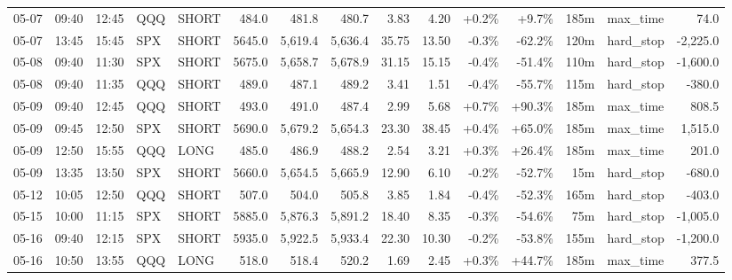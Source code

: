 \documentclass[11pt,a4paper,twoside]{article}
\begin{document}
\begin{landscape}
\begin{center}
\begin{longtable}{>{\color{txtmain}}l l l l l r r r r r r r r >{\color{txtmain}}l r}
05-07 & 09:40 & 12:45 & QQQ & SHORT & 484.0 & 481.8 & 480.7 & 3.83 & 4.20 & \textcolor{wingreen}{+0.2\%} & \textcolor{wingreen}{+9.7\%} & 185m & max\_time & \textcolor{wingreen}{74.0} \\
05-07 & 13:45 & 15:45 & SPX & SHORT & 5645.0 & 5,619.4 & 5,636.4 & 35.75 & 13.50 & \textcolor{lossred}{-0.3\%} & \textcolor{lossred}{-62.2\%} & 120m & hard\_stop & \textcolor{lossred}{-2,225.0} \\
05-08 & 09:40 & 11:30 & SPX & SHORT & 5675.0 & 5,658.7 & 5,678.9 & 31.15 & 15.15 & \textcolor{lossred}{-0.4\%} & \textcolor{lossred}{-51.4\%} & 110m & hard\_stop & \textcolor{lossred}{-1,600.0} \\
05-08 & 09:40 & 11:35 & QQQ & SHORT & 489.0 & 487.1 & 489.2 & 3.41 & 1.51 & \textcolor{lossred}{-0.4\%} & \textcolor{lossred}{-55.7\%} & 115m & hard\_stop & \textcolor{lossred}{-380.0} \\
05-09 & 09:40 & 12:45 & QQQ & SHORT & 493.0 & 491.0 & 487.4 & 2.99 & 5.68 & \textcolor{wingreen}{+0.7\%} & \textcolor{wingreen}{+90.3\%} & 185m & max\_time & \textcolor{wingreen}{808.5} \\
05-09 & 09:45 & 12:50 & SPX & SHORT & 5690.0 & 5,679.2 & 5,654.3 & 23.30 & 38.45 & \textcolor{wingreen}{+0.4\%} & \textcolor{wingreen}{+65.0\%} & 185m & max\_time & \textcolor{wingreen}{1,515.0} \\
05-09 & 12:50 & 15:55 & QQQ & LONG & 485.0 & 486.9 & 488.2 & 2.54 & 3.21 & \textcolor{wingreen}{+0.3\%} & \textcolor{wingreen}{+26.4\%} & 185m & max\_time & \textcolor{wingreen}{201.0} \\
05-09 & 13:35 & 13:50 & SPX & SHORT & 5660.0 & 5,654.5 & 5,665.9 & 12.90 & 6.10 & \textcolor{lossred}{-0.2\%} & \textcolor{lossred}{-52.7\%} & 15m & hard\_stop & \textcolor{lossred}{-680.0} \\
05-12 & 10:05 & 12:50 & QQQ & SHORT & 507.0 & 504.0 & 505.8 & 3.85 & 1.84 & \textcolor{lossred}{-0.4\%} & \textcolor{lossred}{-52.3\%} & 165m & hard\_stop & \textcolor{lossred}{-403.0} \\
05-15 & 10:00 & 11:15 & SPX & SHORT & 5885.0 & 5,876.3 & 5,891.2 & 18.40 & 8.35 & \textcolor{lossred}{-0.3\%} & \textcolor{lossred}{-54.6\%} & 75m & hard\_stop & \textcolor{lossred}{-1,005.0} \\
05-16 & 09:40 & 12:15 & SPX & SHORT & 5935.0 & 5,922.5 & 5,933.4 & 22.30 & 10.30 & \textcolor{lossred}{-0.2\%} & \textcolor{lossred}{-53.8\%} & 155m & hard\_stop & \textcolor{lossred}{-1,200.0} \\
05-16 & 10:50 & 13:55 & QQQ & LONG & 518.0 & 518.4 & 520.2 & 1.69 & 2.45 & \textcolor{wingreen}{+0.3\%} & \textcolor{wingreen}{+44.7\%} & 185m & max\_time & \textcolor{wingreen}{377.5} \\

\end{longtable}
\end{center}
\end{landscape}
\end{document}

